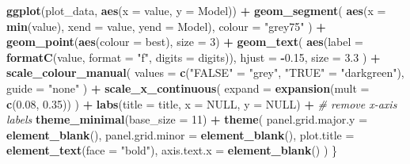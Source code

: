 \documentclass[
  english,
  11pt,
]{article}
\newenvironment{Shaded}{\begin{snugshade}}{\end{snugshade}}
\newcommand{\AttributeTok}[1]{\textcolor[rgb]{0.13,0.29,0.53}{#1}}
\newcommand{\CommentTok}[1]{\textcolor[rgb]{0.56,0.35,0.01}{\textit{#1}}}
\newcommand{\ConstantTok}[1]{\textcolor[rgb]{0.56,0.35,0.01}{#1}}
\newcommand{\DecValTok}[1]{\textcolor[rgb]{0.00,0.00,0.81}{#1}}
\newcommand{\FloatTok}[1]{\textcolor[rgb]{0.00,0.00,0.81}{#1}}
\newcommand{\FunctionTok}[1]{\textcolor[rgb]{0.13,0.29,0.53}{\textbf{#1}}}
\newcommand{\NormalTok}[1]{#1}
\newcommand{\OtherTok}[1]{\textcolor[rgb]{0.56,0.35,0.01}{#1}}
\newcommand{\SpecialCharTok}[1]{\textcolor[rgb]{0.81,0.36,0.00}{\textbf{#1}}}
\newcommand{\StringTok}[1]{\textcolor[rgb]{0.31,0.60,0.02}{#1}}
\newcounter{none} %
\begin{document}
\begin{Shaded}
\begin{Highlighting}[]
    \FunctionTok{ggplot}\NormalTok{(plot\_data, }\FunctionTok{aes}\NormalTok{(}\AttributeTok{x =}\NormalTok{ value, }\AttributeTok{y =}\NormalTok{ Model)) }\SpecialCharTok{+}
        \FunctionTok{geom\_segment}\NormalTok{(}
            \FunctionTok{aes}\NormalTok{(}\AttributeTok{x =} \FunctionTok{min}\NormalTok{(value), }\AttributeTok{xend =}\NormalTok{ value, }\AttributeTok{yend =}\NormalTok{ Model),}
            \AttributeTok{colour =} \StringTok{"grey75"}
\NormalTok{        ) }\SpecialCharTok{+}
        \FunctionTok{geom\_point}\NormalTok{(}\FunctionTok{aes}\NormalTok{(}\AttributeTok{colour =}\NormalTok{ best), }\AttributeTok{size =} \DecValTok{3}\NormalTok{) }\SpecialCharTok{+}
        \FunctionTok{geom\_text}\NormalTok{(}
            \FunctionTok{aes}\NormalTok{(}\AttributeTok{label =} \FunctionTok{formatC}\NormalTok{(value, }\AttributeTok{format =} \StringTok{"f"}\NormalTok{, }\AttributeTok{digits =}\NormalTok{ digits)),}
            \AttributeTok{hjust =} \SpecialCharTok{{-}}\FloatTok{0.15}\NormalTok{,}
            \AttributeTok{size =} \FloatTok{3.3}
\NormalTok{        ) }\SpecialCharTok{+}
        \FunctionTok{scale\_colour\_manual}\NormalTok{(}
            \AttributeTok{values =} \FunctionTok{c}\NormalTok{(}\StringTok{"FALSE"} \OtherTok{=} \StringTok{"grey"}\NormalTok{, }\StringTok{"TRUE"} \OtherTok{=} \StringTok{"darkgreen"}\NormalTok{),}
            \AttributeTok{guide =} \StringTok{"none"}
\NormalTok{        ) }\SpecialCharTok{+}
        \FunctionTok{scale\_x\_continuous}\NormalTok{(}
            \AttributeTok{expand =} \FunctionTok{expansion}\NormalTok{(}\AttributeTok{mult =} \FunctionTok{c}\NormalTok{(}\FloatTok{0.08}\NormalTok{, }\FloatTok{0.35}\NormalTok{))}
\NormalTok{        ) }\SpecialCharTok{+}
        \FunctionTok{labs}\NormalTok{(}\AttributeTok{title =}\NormalTok{ title, }\AttributeTok{x =} \ConstantTok{NULL}\NormalTok{, }\AttributeTok{y =} \ConstantTok{NULL}\NormalTok{) }\SpecialCharTok{+}
        \CommentTok{\# remove x{-}axis labels}
        \FunctionTok{theme\_minimal}\NormalTok{(}\AttributeTok{base\_size =} \DecValTok{11}\NormalTok{) }\SpecialCharTok{+}
        \FunctionTok{theme}\NormalTok{(}
            \AttributeTok{panel.grid.major.y =} \FunctionTok{element\_blank}\NormalTok{(),}
            \AttributeTok{panel.grid.minor =} \FunctionTok{element\_blank}\NormalTok{(),}
            \AttributeTok{plot.title =} \FunctionTok{element\_text}\NormalTok{(}\AttributeTok{face =} \StringTok{"bold"}\NormalTok{),}
            \AttributeTok{axis.text.x =} \FunctionTok{element\_blank}\NormalTok{()}
\NormalTok{        )}
\NormalTok{\}}


\end{Highlighting}
\end{Shaded}
\end{document}
